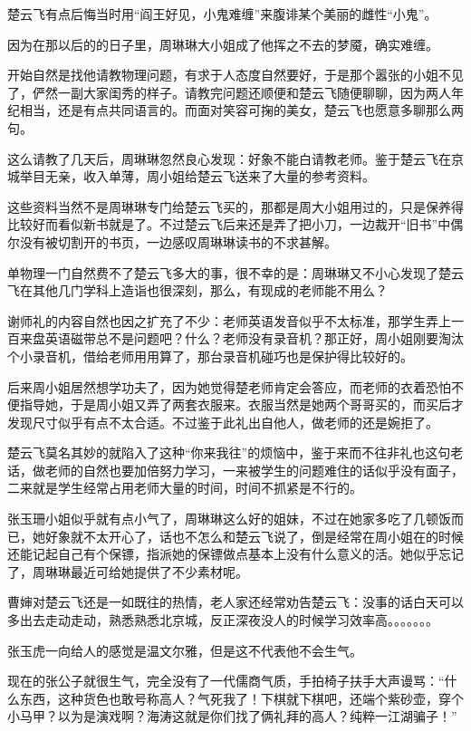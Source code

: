 楚云飞有点后悔当时用“阎王好见，小鬼难缠”来腹诽某个美丽的雌性“小鬼”。

因为在那以后的的日子里，周琳琳大小姐成了他挥之不去的梦魇，确实难缠。

开始自然是找他请教物理问题，有求于人态度自然要好，于是那个嚣张的小姐不见了，俨然一副大家闺秀的样子。请教完问题还顺便和楚云飞随便聊聊，因为两人年纪相当，还是有点共同语言的。而面对笑容可掬的美女，楚云飞也愿意多聊那么两句。

这么请教了几天后，周琳琳忽然良心发现：好象不能白请教老师。鉴于楚云飞在京城举目无亲，收入单薄，周小姐给楚云飞送来了大量的参考资料。

这些资料当然不是周琳琳专门给楚云飞买的，那都是周大小姐用过的，只是保养得比较好而看似新书就是了。不过楚云飞后来还是弄了把小刀，一边裁开“旧书”中偶尔没有被切割开的书页，一边感叹周琳琳读书的不求甚解。

单物理一门自然费不了楚云飞多大的事，很不幸的是：周琳琳又不小心发现了楚云飞在其他几门学科上造诣也很深刻，那么，有现成的老师能不用么？

谢师礼的内容自然也因之扩充了不少：老师英语发音似乎不太标准，那学生弄上一百来盘英语磁带总不是问题吧？什么？老师没有录音机？那正好，周小姐刚要淘汰个小录音机，借给老师用用算了，那台录音机碰巧也是保护得比较好的。

后来周小姐居然想学功夫了，因为她觉得楚老师肯定会答应，而老师的衣着恐怕不便指导她，于是周小姐又弄了两套衣服来。衣服当然是她两个哥哥买的，而买后才发现尺寸似乎有点不太合适。不过鉴于此礼出自他人，做老师的还是婉拒了。

楚云飞莫名其妙的就陷入了这种“你来我往”的烦恼中，鉴于来而不往非礼也这句老话，做老师的自然也要加倍努力学习，一来被学生的问题难住的话似乎没有面子，二来就是学生经常占用老师大量的时间，时间不抓紧是不行的。

张玉珊小姐似乎就有点小气了，周琳琳这么好的姐妹，不过在她家多吃了几顿饭而已，她好象就不太开心了，话也不怎么和楚云飞说了，倒是经常在周小姐在的时候还能记起自己有个保镖，指派她的保镖做点基本上没有什么意义的活。她似乎忘记了，周琳琳最近可给她提供了不少素材呢。

曹婶对楚云飞还是一如既往的热情，老人家还经常劝告楚云飞：没事的话白天可以多出去走动走动，熟悉熟悉北京城，反正深夜没人的时候学习效率高。。。。。。。

张玉虎一向给人的感觉是温文尔雅，但是这不代表他不会生气。

现在的张公子就很生气，完全没有了一代儒商气质，手拍椅子扶手大声谩骂：“什么东西，这种货色也敢号称高人？气死我了！下棋就下棋吧，还端个紫砂壶，穿个小马甲？以为是演戏啊？海涛这就是你们找了俩礼拜的高人？纯粹一江湖骗子！”

